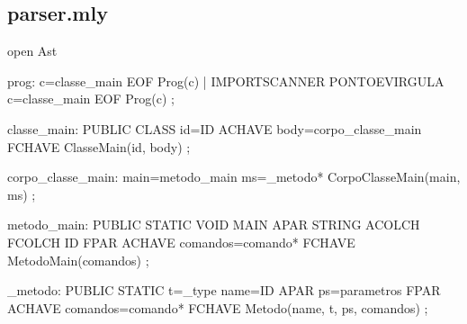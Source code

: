 \documentclass[12pt,a4paper,twoside]{report}
\begin{document}
\subsection{parser.mly}
\begin{terminal}
  open Ast










   
prog:
	c=classe_main EOF	{ Prog(c) }
    | IMPORTSCANNER PONTOEVIRGULA c=classe_main EOF { Prog(c) }
    ;

classe_main:
    PUBLIC CLASS id=ID ACHAVE body=corpo_classe_main FCHAVE { ClasseMain(id, body) }
    ;

corpo_classe_main:
	main=metodo_main ms=_metodo*  { CorpoClasseMain(main, ms) }
	;

metodo_main:
	PUBLIC STATIC VOID MAIN APAR STRING ACOLCH FCOLCH ID FPAR ACHAVE comandos=comando*  FCHAVE { MetodoMain(comandos) }
	;

_metodo:
    PUBLIC STATIC t=_type name=ID APAR ps=parametros FPAR ACHAVE comandos=comando* FCHAVE { Metodo(name, t, ps, comandos) }
	;


\end{terminal}
\end{document}

